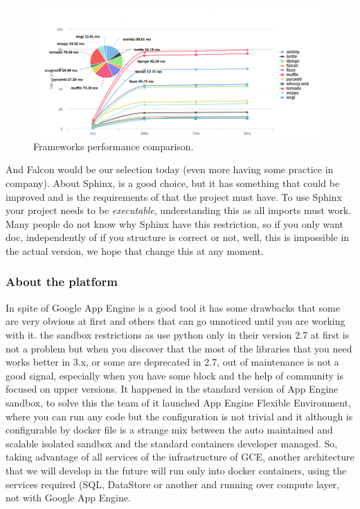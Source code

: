 \begin{figure}[H]
  \includegraphics[scale=0.5]{img/graphics/frameworks.png}
  \centering
  \caption{Frameworks performance comparison.}
\end{figure}


\noindent And Falcon would be our selection today (even more having some practice in
company).
\intro
About Sphinx, is a good choice, but it has something that could be improved and
is the requirements of that the project must have. To use Sphinx your project
needs to be \textit{executable}, understanding this as all imports must work.
Many people do not know why Sphinx have this restriction, so if you
only want doc, independently of if you structure is correct or not, well, this is
impossible in the actual version, we hope that change this at any moment.

\subsubsection{About the platform}

In spite of Google App Engine is a good tool it has some drawbacks that some are
very obvious at first and others that can go unnoticed until you are working with it.
the sandbox restrictions as use python only in their version 2.7 at first is not
a problem but when you discover that the most of the libraries that you need works
better in 3.x, or some are deprecated in 2.7, out of maintenance is not a good
signal, especially when you have some block and the help of community is focused
on upper versions. It happened in the standard version of App Engine sandbox, to
solve this the team of it launched App Engine Flexible Environment, where you can
run any code but the configuration is not trivial and it although is configurable by
docker file is a strange mix between the auto maintained and scalable isolated
sandbox and the standard containers developer managed.
\intro
So, taking advantage of all services of the infrastructure of GCE, another
architecture that we will develop in the future will run only into docker containers,
using the services required (SQL, DataStore or another and running over compute layer,
not with Google App Engine.

